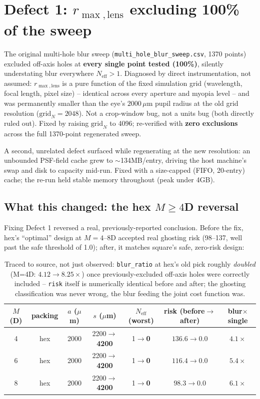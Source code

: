 \documentclass[11pt]{report}
\newcommand{\Neff}{N_{\text{eff}}}
\begin{document}
\section{Defect 1: \texorpdfstring{$r_{\max,\text{lens}}$}{r\_max\_lens} excluding 100\% of the sweep}
\label{sec:defect1}
The original multi-hole blur sweep (\texttt{multi\_hole\_blur\_sweep.csv}, 1370 points)
excluded off-axis holes at \textbf{every single point tested (100\%)}, silently understating
blur everywhere $\Neff>1$. Diagnosed by direct instrumentation, not assumed: $r_{\max,
\text{lens}}$ is a pure function of the fixed simulation grid (wavelength, focal length,
pixel size) -- identical across every aperture and myopia level -- and was permanently
smaller than the eye's $2000\,\mu$m pupil radius at the old grid resolution
($\text{grid}_N{=}2048$). Not a crop-window bug, not a units bug (both directly ruled out).
Fixed by raising $\text{grid}_N$ to 4096; re-verified with \textbf{zero exclusions} across
the full 1370-point regenerated sweep.

A second, unrelated defect surfaced while regenerating at the new resolution: an unbounded
PSF-field cache grew to $\sim$134MB/entry, driving the host machine's swap and disk to
capacity mid-run. Fixed with a size-capped (FIFO, 20-entry) cache; the re-run held stable
memory throughout (peak under 4GB).

\subsection*{What this changed: the hex $M{\geq}4$D reversal}
Fixing Defect 1 reversed a real, previously-reported conclusion. Before the fix, hex's
``optimal'' design at $M{=}4$--$8$D accepted real ghosting risk (98--137, well past the
safe threshold of 1.0); after, it matches square's safe, zero-risk design:
\begin{table}[h!]
\centering\small
\begin{tabular}{ccccccc}
\toprule
$M$ (D) & packing & $a$ ($\mu$m) & $s$ ($\mu$m) & $\Neff$(worst) & risk (before$\to$after) &
blur$\times$single \\
\midrule
4 & hex & 2000 & 2200$\to$\textbf{4200} & 1$\to$\textbf{0} & $136.6\to\mathbf{0.0}$ & $4.1\times$ \\
6 & hex & 2000 & 2200$\to$\textbf{4200} & 1$\to$\textbf{0} & $116.4\to\mathbf{0.0}$ & $5.4\times$ \\
8 & hex & 2000 & 2200$\to$\textbf{4200} & 1$\to$\textbf{0} & $98.3\to\mathbf{0.0}$ & $6.1\times$ \\
\bottomrule
\end{tabular}
\caption{Traced to source, not just observed: \texttt{blur\_ratio} at hex's old pick
roughly \emph{doubled} (M=4D: $4.12\to8.25\times$) once previously-excluded off-axis holes
were correctly included -- \texttt{risk} itself is numerically identical before and after;
the ghosting classification was never wrong, the blur feeding the joint cost function was.}
\end{table}
\end{document}
